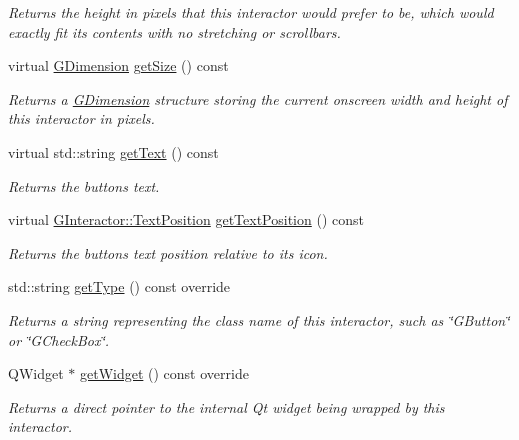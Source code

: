 \begin{DoxyCompactItemize}
\begin{DoxyCompactList}\small\item\em Returns the height in pixels that this interactor would prefer to be, which would exactly fit its contents with no stretching or scrollbars. \end{DoxyCompactList}\item 
virtual \mbox{\hyperlink{structsgl_1_1GDimension}{G\+Dimension}} \mbox{\hyperlink{classsgl_1_1GInteractor_a7b4eec96a2bdc6420695d5796a78eea9}{get\+Size}} () const
\begin{DoxyCompactList}\small\item\em Returns a \mbox{\hyperlink{structsgl_1_1GDimension}{G\+Dimension}} structure storing the current onscreen width and height of this interactor in pixels. \end{DoxyCompactList}\item 
virtual std\+::string \mbox{\hyperlink{classsgl_1_1GButton_aff553c50924b836c29f146ed34a7c6ec}{get\+Text}} () const
\begin{DoxyCompactList}\small\item\em Returns the button\textquotesingle{}s text. \end{DoxyCompactList}\item 
virtual \mbox{\hyperlink{classsgl_1_1GInteractor_a8e0d441725a81d2bbdebbea09078260e}{G\+Interactor\+::\+Text\+Position}} \mbox{\hyperlink{classsgl_1_1GButton_a3fc623df3ced62aca93fc344c2426899}{get\+Text\+Position}} () const
\begin{DoxyCompactList}\small\item\em Returns the button\textquotesingle{}s text position relative to its icon. \end{DoxyCompactList}\item 
std\+::string \mbox{\hyperlink{classsgl_1_1GButton_a9b72ede4ee8520f987a0c01e30654814}{get\+Type}} () const override
\begin{DoxyCompactList}\small\item\em Returns a string representing the class name of this interactor, such as \char`\"{}\+G\+Button\char`\"{} or \char`\"{}\+G\+Check\+Box\char`\"{}. \end{DoxyCompactList}\item 
Q\+Widget $\ast$ \mbox{\hyperlink{classsgl_1_1GButton_a3b33a602b31a6b809d020535a59db3b4}{get\+Widget}} () const override
\begin{DoxyCompactList}\small\item\em Returns a direct pointer to the internal Qt widget being wrapped by this interactor. \end{DoxyCompactList}\item 

\end{DoxyCompactItemize}
